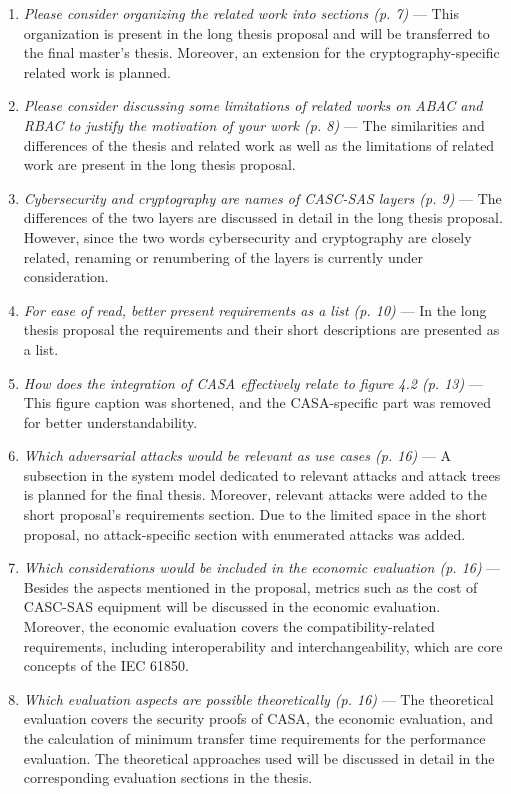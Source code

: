 \begin{enumerate}[label=Q\arabic*.]
    \item \textit{Please consider organizing the related work into sections (p. 7)} --- This organization is present in the long thesis proposal and will be transferred to the final master's thesis. Moreover, an extension for the cryptography-specific related work is planned.
    \item \textit{Please consider discussing some limitations of related works on ABAC and RBAC to justify the motivation of your work (p. 8)} --- The similarities and differences of the thesis and related work as well as the limitations of related work are present in the long thesis proposal.
    \item \textit{Cybersecurity and cryptography are names of CASC-SAS layers (p. 9)} --- The differences of the two layers are discussed in detail in the long thesis proposal. However, since the two words cybersecurity and cryptography are closely related, renaming or renumbering of the layers is currently under consideration.
    \item \textit{For ease of read, better present requirements as a list (p. 10)} --- In the long thesis proposal the requirements and their short descriptions are presented as a list.
    \item \textit{How does the integration of CASA effectively relate to figure 4.2 (p. 13)} --- This figure caption was shortened, and the CASA-specific part was removed for better understandability.
    \item \textit{Which adversarial attacks would be relevant as use cases (p. 16)} --- A subsection in the system model dedicated to relevant attacks and attack trees is planned for the final thesis. Moreover, relevant attacks were added to the short proposal's requirements section. Due to the limited space in the short proposal, no attack-specific section with enumerated attacks was added.
    \item \textit{Which considerations would be included in the economic evaluation (p. 16)} --- Besides the aspects mentioned in the proposal, metrics such as the cost of CASC-SAS equipment will be discussed in the economic evaluation. Moreover, the economic evaluation covers the compatibility-related requirements, including interoperability and interchangeability, which are core concepts of the IEC 61850.
    \item \textit{Which evaluation aspects are possible theoretically (p. 16)} --- The theoretical evaluation covers the security proofs of CASA, the economic evaluation, and the calculation of minimum transfer time requirements for the performance evaluation. The theoretical approaches used will be discussed in detail in the corresponding evaluation sections in the thesis.

\end{enumerate}

